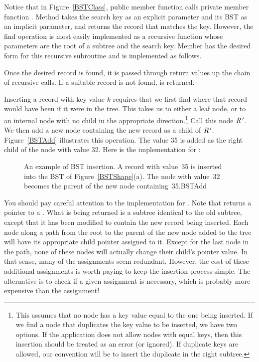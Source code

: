 Notice that in Figure~\ref{BSTClass}, public member function
 calls private member function .
Method  takes the search key as an explicit parameter
and its BST as an implicit parameter, and returns the record that
matches the key.
However, the find operation is most easily implemented as a
recursive function whose parameters are the root of a
subtree and the search key.
Member  has the desired form for this recursive
subroutine and is implemented as follows.


\noindent Once the desired record is found, it is passed through
return values up the chain of recursive calls.
If a suitable record is not found,  is returned.

Inserting a record with key value \(k\) requires that we first find
where that record would have been if it were in the tree.
This takes us to either a leaf node, or to an internal node with no
child in the appropriate direction.\footnote{This assumes that no node
has a key value equal to the one being inserted.
If we find a node that duplicates the key value to be inserted,
we have two options.
If the application does not allow nodes with equal keys, then this
insertion should be treated as an error (or ignored).
If duplicate keys are allowed, our convention will be to insert the
duplicate in the right subtree.}
Call this node \({\textit{R}}\,'\).
We then add a new node containing the new record as a child
of \({\textit{R}}\,'\).
Figure~\ref{BSTAdd} illustrates this operation.
The value 35 is added as the right child of the node with value 32.
Here is the implementation for :

\begin{figure}
\vspace{-\bigskipamount}
{An example of BST insertion.
A record with value~35 is inserted into the BST of
Figure~\ref{BSTShape}(a).
The node with value~32 becomes the parent of the new node
containing~35.}{BSTAdd}
\bigskip
\end{figure}


You should pay careful attention to the implementation for
.
Note that  returns a pointer to a .
What is being returned is a subtree identical to the old subtree,
except that it has been modified to contain the new record being
inserted.
Each node along a path from the root to the parent of the new node
added to the tree will have its appropriate child pointer assigned to
it.
Except for the last node in the path, none of these nodes will
actually change their child's pointer value.
In that sense, many of the assignments seem redundant.
However, the cost of these additional assignments is worth paying to
keep the insertion process simple.
The alternative is to check if a given assignment is necessary, which
is probably more expensive than the assignment!

